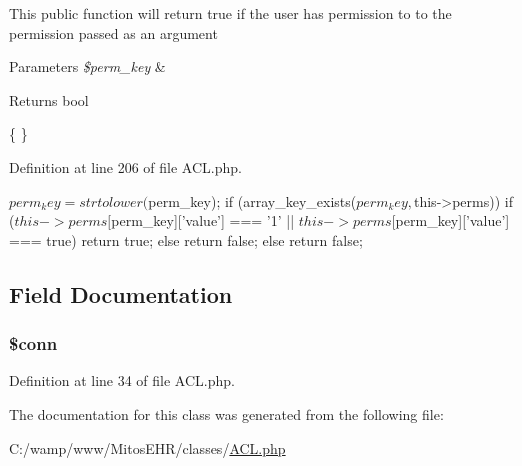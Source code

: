 \-This public function will return true if the user has permission to to the permission passed as an argument


\begin{DoxyParams}{\-Parameters}
{\em \$perm\-\_\-key} & \\
\hline
\end{DoxyParams}
\begin{DoxyReturn}{\-Returns}
bool
\end{DoxyReturn}
\{ \} 

\-Definition at line 206 of file \-A\-C\-L.\-php.


\begin{DoxyCode}
                                                {
                $perm_key = strtolower($perm_key);
                if (array_key_exists($perm_key,$this->perms)){
            if ($this->perms[$perm_key]['value'] === '1' || $this->perms[
      $perm_key]['value'] === true){
                return true;
            } else {
                return false;
            }
        } else {
            return false;
                }
        }
\end{DoxyCode}


\subsection{\-Field \-Documentation}
\hypertarget{class_a_c_l_aa8a5a87b9c1a6a0819b88447cbe41877}{
\subsubsection[{\$conn}]{\setlength{\rightskip}{0pt plus 5cm}\$conn}}\label{class_a_c_l_aa8a5a87b9c1a6a0819b88447cbe41877}


\-Definition at line 34 of file \-A\-C\-L.\-php.



\-The documentation for this class was generated from the following file\-:\begin{DoxyCompactItemize}
\item 
\-C\-:/wamp/www/\-Mitos\-E\-H\-R/classes/\hyperlink{_a_c_l_8php}{\-A\-C\-L.\-php}\end{DoxyCompactItemize}
